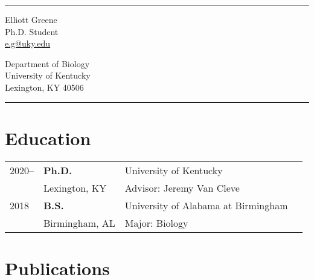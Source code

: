 \documentclass[11pt]{article}
\begin{document}
\rule{1\textwidth}{1pt}


\thispagestyle{plain}
\begin{minipage}[t]{3.00in}    \centering
    Elliott Greene \\
    Ph.D. Student \\
    {\href{mailto:e.g@uky.edu}{e.g@uky.edu}}

\end{minipage}
\begin{minipage}[t]{3.0in} \centering
    Department of Biology \\
    University of Kentucky \\
    Lexington, KY 40506
\end{minipage}

\vspace{6pt}

\rule{1\textwidth}{1pt}
\vspace{6pt}


    \section*{Education}
        \begin{tabular}{@{}p{1.0in}@{}p{2.0in}@{}p{3in}r}
            2020-- & \textbf{Ph.D.} & University of Kentucky \\
            & Lexington, KY & Advisor: Jeremy Van Cleve \\
            2018 & \textbf{B.S.} & University of Alabama at Birmingham\\
            & Birmingham, AL  & Major: Biology
        \end{tabular}


        
    \section*{Publications}
\end{document}
